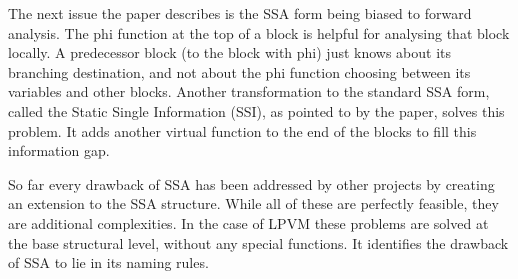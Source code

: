 The next issue the paper describes is the SSA form being biased to forward
analysis. The phi function at the top of a block is helpful for analysing that
block locally. A predecessor block (to the block with phi) just knows about its
branching destination, and not about the phi function choosing between its
variables and other blocks. Another transformation to the standard SSA form,
called the Static Single Information (SSI), as pointed to by the paper, solves
this problem. It adds another virtual function to the end of the blocks to fill
this information gap. 

So far every drawback of SSA has been addressed by other projects by creating
an extension to the SSA structure. While all of these are perfectly feasible,
they are additional complexities. In the case of LPVM these problems are solved
at the base structural level, without any special functions. It identifies the
drawback of SSA to lie in its naming rules. 











